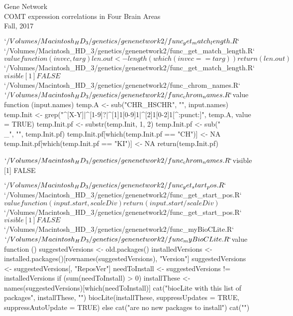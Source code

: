 \documentclass[11pt]{article}
\begin{document}

 

\hspace{-1.5em}Gene Network\\
COMT expression correlations in Four Brain Areas\\
Fall, 2017\\



\begin{Schunk}
\begin{Soutput}
$`/Volumes/Macintosh_HD_3/genetics/genenetwork2/func_get_match_length.R`
$`/Volumes/Macintosh_HD_3/genetics/genenetwork2/func_get_match_length.R`$value
function (invec, targ) 
{
    len.out <- length(which(invec == targ))
    return(len.out)
}

$`/Volumes/Macintosh_HD_3/genetics/genenetwork2/func_get_match_length.R`$visible
[1] FALSE


$`/Volumes/Macintosh_HD_3/genetics/genenetwork2/func_chrom_names.R`
$`/Volumes/Macintosh_HD_3/genetics/genenetwork2/func_chrom_names.R`$value
function (input.names) 
{
    temp.A <- sub("CHR_HSCHR", "", input.names)
    temp.Init <- grep("^[X-Y]|^[1-9]?|^[1]{1}[0-9]{1}|^[2]{1}[0-2]{1}[^:punct:]", 
        temp.A, value = TRUE)
    temp.Init.pf <- substr(temp.Init, 1, 2)
    temp.Init.pf <- sub("\\_", "", temp.Init.pf)
    temp.Init.pf[which(temp.Init.pf == "CH")] <- NA
    temp.Init.pf[which(temp.Init.pf == "KI")] <- NA
    return(temp.Init.pf)
}

$`/Volumes/Macintosh_HD_3/genetics/genenetwork2/func_chrom_names.R`$visible
[1] FALSE


$`/Volumes/Macintosh_HD_3/genetics/genenetwork2/func_get_start_pos.R`
$`/Volumes/Macintosh_HD_3/genetics/genenetwork2/func_get_start_pos.R`$value
function (input.start, scaleDiv) 
{
    return(input.start/scaleDiv)
}

$`/Volumes/Macintosh_HD_3/genetics/genenetwork2/func_get_start_pos.R`$visible
[1] FALSE


$`/Volumes/Macintosh_HD_3/genetics/genenetwork2/func_myBioCLite.R`
$`/Volumes/Macintosh_HD_3/genetics/genenetwork2/func_myBioCLite.R`$value
function () 
{
    suggestedVersions <- old.packages()
    installedVersions <- installed.packages()[rownames(suggestedVersions), 
        "Version"]
    suggestedVersions <- suggestedVersions[, "ReposVer"]
    needToInstall <- suggestedVersions != installedVersions
    if (sum(needToInstall) > 0) {
        installThese <- names(suggestedVersions)[which(needToInstall)]
        cat("\ncalling biocLite with this list of packages\n", 
            installThese, "\n")
        biocLite(installThese, suppressUpdates = TRUE, suppressAutoUpdate = TRUE)
    }
    else {
        cat("\nThere are no new packages to install\n")
    }
    cat("\ndone\n\n")
}


\end{Soutput}
\end{Schunk}
\end{document}
